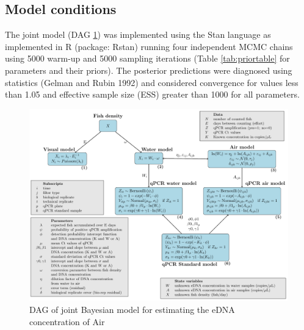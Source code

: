 \documentclass{article}
\begin{document}
\subsection{Model conditions}
The joint model (DAG \ref{fig:DAG}) was implemented using the Stan language as implemented in R (package: Rstan) running four independent MCMC chains using 5000 warm-up and 5000 sampling iterations (Table \ref{tab:priortable} for parameters and their priors). The posterior predictions were diagnosed using statistics (Gelman and Rubin 1992) and considered convergence for values less than 1.05 and effective sample size (ESS) greater than 1000 for all parameters.

\begin{figure}[tbhp] 
\centering
\includegraphics[width=16.5cm]{Plots/DAG.pdf}  
\caption{DAG of joint Bayesian model for estimating the eDNA concentration of Air}
\label{fig:DAG}
\end{figure}
\end{document}
